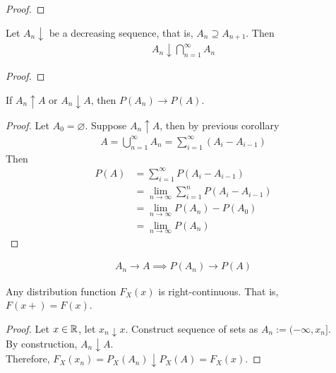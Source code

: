 \documentclass{article}
\begin{document}
   	\begin{proof}
   	\end{proof}
   	
   	\begin{corollary}
   		Let $A_n \downarrow$ be a decreasing sequence, that is, $A_{n} \supseteq A_{n+1}$. Then
   		\begin{align}
   			A_n \downarrow \bigcap_{n=1}^\infty A_n
   		\end{align}
   	\end{corollary}
   	
   	\begin{proof}
   	\end{proof}
   	
   	\begin{proposition}
   		If $A_n \uparrow A$ or $A_n \downarrow A$, then $P(A_n) \to P(A)$.
   	\end{proposition}
   	
   	\begin{proof}
   		Let $A_0 = \varnothing$. Suppose $A_n \uparrow A$, then by previous corollary
   		\begin{align}
   			A = \bigcup_{n=1}^\infty A_n = \sum_{i=1}^\infty (A_i - A_{i-1})
   		\end{align}
   		Then 
   		\begin{align}
   			P(A) &= \sum_{i=1}^\infty P(A_i - A_{i-1}) \\
   			&= \lim_{n\to\infty}\sum_{i=1}^n P(A_i - A_{i-1}) \\
   			&= \lim_{n\to\infty}P(A_n) - P(A_0) \\
   			&= \lim_{n\to\infty}P(A_n)
   		\end{align}
   	\end{proof}
   	
   	\begin{proposition}
   		\begin{align}
   			A_{n} \rightarrow A \implies P\left(A_{n}\right) \rightarrow P(A)
   		\end{align}
   	\end{proposition}
   	
   	\begin{theorem}
   		Any distribution function $F_X(x)$ is right-continuous. That is, $F(x+) = F(x)$.
   	\end{theorem}
   	
   	\begin{proof}
   		Let $x \in \mathbb{R}$, let $x_n \downarrow x$. Construct sequence of sets as $A_n := (-\infty, x_n]$.\\
   		By construction, $A_n \downarrow A$. \\
   		Therefore, $F_X(x_n) = P_X(A_n) \downarrow P_X(A) = F_X(x)$.
   	\end{proof}
   	
\end{document}
